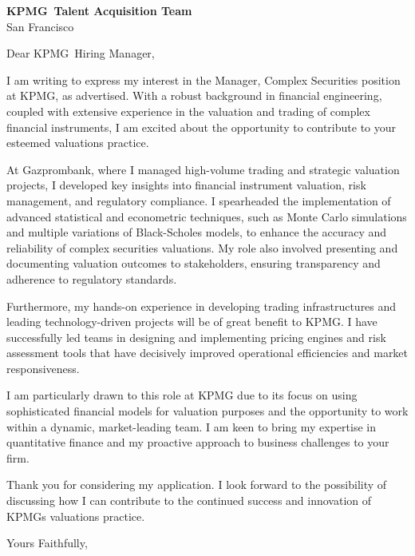 \documentclass{letter}
\newcommand{\company}{KPMG}
\begin{document}
\begin{letter}{\textbf{\company\ Talent Acquisition Team} \\                
    San Francisco }

\opening{Dear \company\ Hiring Manager,}

I am writing to express my interest in the Manager, Complex Securities position at KPMG, as advertised. With a robust background in financial engineering, coupled with extensive experience in the valuation and trading of complex financial instruments, I am excited about the opportunity to contribute to your esteemed valuations practice.

At Gazprombank, where I managed high-volume trading and strategic valuation projects, I developed key insights into financial instrument valuation, risk management, and regulatory compliance. I spearheaded the implementation of advanced statistical and econometric techniques, such as Monte Carlo simulations and multiple variations of Black-Scholes models, to enhance the accuracy and reliability of complex securities valuations. My role also involved presenting and documenting valuation outcomes to stakeholders, ensuring transparency and adherence to regulatory standards.

Furthermore, my hands-on experience in developing trading infrastructures and leading technology-driven projects will be of great benefit to KPMG. I have successfully led teams in designing and implementing pricing engines and risk assessment tools that have decisively improved operational efficiencies and market responsiveness.

I am particularly drawn to this role at KPMG due to its focus on using sophisticated financial models for valuation purposes and the opportunity to work within a dynamic, market-leading team. I am keen to bring my expertise in quantitative finance and my proactive approach to business challenges to your firm.

Thank you for considering my application. I look forward to the possibility of discussing how I can contribute to the continued success and innovation of KPMGs valuations practice.



\closing{Yours Faithfully,}

\end{letter}
\end{document}
